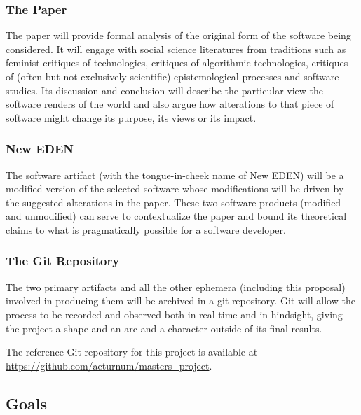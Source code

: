 \documentclass[a4paper,man,natbib]{apa6}
\begin{document}
   \subsubsection*{The Paper}
   The paper will provide formal analysis of the original form of the software being considered. It will engage with social science literatures from traditions such as feminist critiques of technologies, critiques of algorithmic technologies, critiques of (often but not exclusively scientific) epistemological processes and software studies. Its discussion and conclusion will describe the particular view the software renders of the world and also argue how alterations to that piece of software might change its purpose, its views or its impact.
   \subsubsection*{New EDEN}
   The software artifact (with the tongue-in-cheek name of New EDEN) will be a modified version of the selected software whose modifications will be driven by the suggested alterations in the paper. These two software products (modified and unmodified) can serve to contextualize the paper and bound its theoretical claims to what is pragmatically possible for a software developer.
   \subsubsection*{The Git Repository}
   The two primary artifacts and all the other ephemera (including this proposal) involved in producing them will be archived in a git repository. Git will allow the process to be recorded and observed both in real time and in hindsight, giving the project a shape and an arc and a character outside of its final results. 

   The reference Git repository for this project is available at \url{https://github.com/aeturnum/masters_project}.
   \subsection*{Goals}

   \newpage
   \printnoidxglossaries

   \newpage
   \setlength{\parindent}{4em}
   
\end{document}
